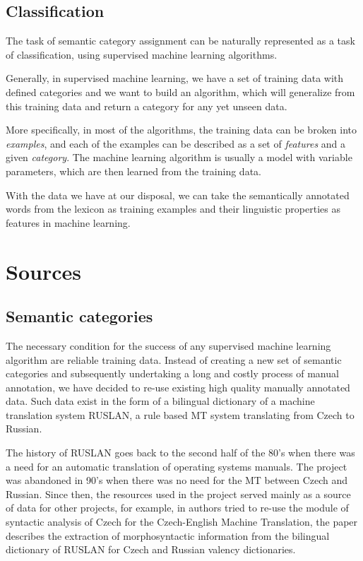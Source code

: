 \documentclass[letterpaper]{article}
\begin{document}
\subsection{Classification}
The task of semantic category assignment can be naturally represented as a task of classification, using supervised machine learning algorithms.

Generally, in supervised machine learning, we have a set of training data with defined 
categories and we want to build an algorithm, which will generalize from this training data and return a category for any yet unseen data.

More specifically, in most of the algorithms, the training data can be broken into
\textit{examples}, and each of the examples can be described as a set of \textit{features} and a given \textit{category}. The machine learning algorithm is usually a model with variable parameters, which are then learned from the training data.

With the data we have at our disposal, we can take the semantically annotated words from the lexicon as training examples 
and their linguistic properties as features in machine learning.


\section{Sources}
\subsection{Semantic categories}
The necessary condition for the success of any supervised machine learning algorithm are reliable training data. Instead of creating a new set of semantic categories and subsequently undertaking a long and costly process of manual annotation, we have decided to re-use existing high quality manually annotated data. Such data exist in the form of a bilingual dictionary of a machine translation system RUSLAN, a rule based MT system translating from Czech to Russian.

The history of RUSLAN \cite{oliva1989parser} goes back to the second half of the 80's when there was a need for an automatic translation of operating systems manuals. The project was abandoned in 90's when
there was no need for the MT between Czech and Russian. Since then, the resources used in the project served mainly as a source of data for other projects, for
example, in \cite{mt-recycled} authors tried to re-use the module
of syntactic analysis of Czech for the Czech-English Machine Translation,
the paper \cite{pisa2010} describes the extraction of morphosyntactic information from the bilingual dictionary of RUSLAN for Czech and Russian valency dictionaries.
\end{document}
